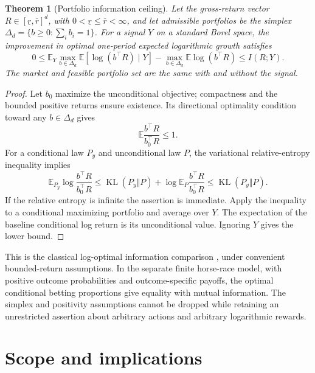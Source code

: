 \documentclass[11pt]{article}
\theoremstyle{plain}
\newtheorem{theorem}{Theorem}[section]
\theoremstyle{definition}
\theoremstyle{remark}
\newcommand{\E}{\mathbb E}
\DeclareMathOperator{\KL}{KL}
\begin{document}
\begin{theorem}[Portfolio information ceiling]\label{thm:information}
Let the gross-return vector \(R\in[\underline r,\overline r]^d\), with
\(0<\underline r\le\overline r<\infty\), and let admissible portfolios
be the simplex \(\Delta_d=\{b\ge0:\sum_i b_i=1\}\).
For a signal \(Y\) on a standard Borel space, the improvement in
optimal one-period expected
logarithmic growth satisfies
\[
0\le
\E_Y\max_{b\in\Delta_d}\E[\log(b^\top R)\mid Y]
 -\max_{b\in\Delta_d}\E\log(b^\top R)
\le I(R;Y).
\]
The market and feasible portfolio set are the same with and without
the signal.
\end{theorem}
\begin{proof}
Let \(b_0\) maximize the unconditional objective; compactness and the
bounded positive returns ensure existence. Its directional optimality
condition toward any \(b\in\Delta_d\) gives
\[
\E\frac{b^\top R}{b_0^\top R}\le1.
\]
For a conditional law \(P_y\) and unconditional law \(P\), the
variational relative-entropy inequality implies
\[
\E_{P_y}\log\frac{b^\top R}{b_0^\top R}
\le\KL(P_y\Vert P)
 +\log\E_P\frac{b^\top R}{b_0^\top R}
\le\KL(P_y\Vert P).
\]
If the relative entropy is infinite the assertion is immediate.
Apply the inequality to a conditional maximizing portfolio and
average over \(Y\). The expectation of the baseline conditional
log return is its unconditional value. Ignoring \(Y\) gives the
lower bound.
\end{proof}

This is the classical log-optimal information comparison
\citep{Kelly1956,CoverThomas2006}, under convenient bounded-return
assumptions. In the separate finite horse-race model, with positive
outcome probabilities and outcome-specific payoffs, the optimal
conditional betting proportions give equality with mutual information.
The simplex and positivity assumptions cannot be dropped while
retaining an unrestricted assertion about arbitrary actions and
arbitrary logarithmic rewards.

\section{Scope and implications}
\end{document}
